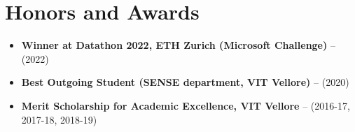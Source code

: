 \section{Honors and Awards}

\vspace{1pt}

\begin{itemize}
\item \textbf{Winner at Datathon 2022, ETH Zurich (Microsoft Challenge)} -- (2022)
\item \textbf{Best Outgoing Student (SENSE department, VIT Vellore)} -- (2020)
\item \textbf{Merit Scholarship for Academic Excellence, VIT Vellore } -- (2016-17, 2017-18, 2018-19)

\end{itemize}